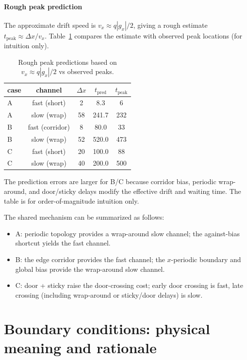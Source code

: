 \documentclass[11pt]{article}
\begin{document}
\paragraph{Rough peak prediction}
The approximate drift speed is $v_x \approx q|g_x|/2$, giving a rough estimate $t_{\text{peak}}\approx \Delta x / v_x$. Table~\ref{tab:peak-predict} compares the estimate with observed peak locations (for intuition only).

\begin{table}[!htbp]
  \centering
  \begin{tabular}{lcccc}
    \toprule
    case & channel & $\Delta x$ & $t_{\text{pred}}$ & $t_{\text{peak}}$ \\
    \midrule
    A & fast (short) & 2 & 8.3 & 6 \\
    A & slow (wrap) & 58 & 241.7 & 232 \\
    B & fast (corridor) & 8 & 80.0 & 33 \\
    B & slow (wrap) & 52 & 520.0 & 473 \\
    C & fast (short) & 20 & 100.0 & 88 \\
    C & slow (wrap) & 40 & 200.0 & 500 \\
    \bottomrule
  \end{tabular}
  \caption{Rough peak predictions based on $v_x \approx q|g_x|/2$ vs observed peaks.}
  \label{tab:peak-predict}
\end{table}

The prediction errors are larger for B/C because corridor bias, periodic wrap-around, and door/sticky delays modify the effective drift and waiting time. The table is for order-of-magnitude intuition only.

The shared mechanism can be summarized as follows:
\begin{itemize}
  \item A: periodic topology provides a wrap-around slow channel; the against-bias shortcut yields the fast channel.
  \item B: the edge corridor provides the fast channel; the $x$-periodic boundary and global bias provide the wrap-around slow channel.
  \item C: door + sticky raise the door-crossing cost; early door crossing is fast, late crossing (including wrap-around or sticky/door delays) is slow.
\end{itemize}

\section{Boundary conditions: physical meaning and rationale}
\end{document}
